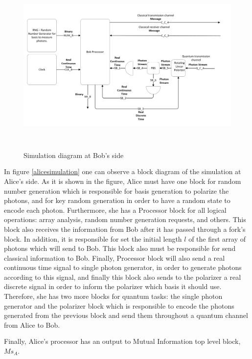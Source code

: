 \begin{figure}[h]
	\centering
	\includegraphics[width=1.0\textwidth, height=9cm]{./sdf/bb84_with_discrete_variables/figures/bob_simulation.png}
	\caption{Simulation diagram at Bob's side}\label{bobsimulation}
\end{figure}

    In figure \ref{alicesimulation} one can observe a block diagram of the simulation at Alice's side. As it is shown in the figure, Alice must have one block for random number generation which is responsible for basis generation to polarize the photons, and for key random generation in order to have a random state to encode each photon. Furthermore, she has a Processor block for all logical operations: array analysis, random number generation requests, and others. This block also receives the information from Bob after it has passed through a fork's block. In addition, it is responsible for set the initial length $l$ of the first array of photons which will send to Bob. This block also must be responsible for send classical information to Bob. Finally, Processor block will also send a real continuous time signal to single photon generator, in order to generate photons according to this signal, and finally this block also sends to the polarizer a real discrete signal in order to inform the polarizer which basis it should use. Therefore, she has two more blocks for quantum tasks: the single photon generator and the polarizer block which is responsible to encode the photons generated from the previous block and send them throughout a quantum channel from Alice to Bob.

    Finally, Alice's processor has an output to Mutual Information top level block, $Ms_{A}$.

